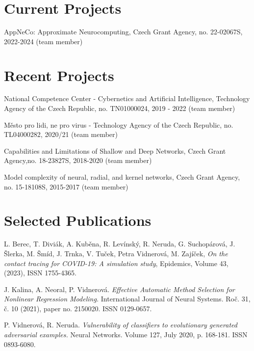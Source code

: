 \documentclass[a4paper, oneside, final]{scrartcl} %
\begin{document}
\section{Current  Projects}
 AppNeCo: Approximate Neurocomputing,
 Czech Grant Agency, no. 22-02067S, 2022-2024 (team member)

\section{Recent  Projects}
 \noindent
 National Competence Center - Cybernetics and Artificial Intelligence,
 Technology Agency of the Czech Republic, no. TN01000024, 2019 - 2022 (team member) 

 \noindent
 Město pro lidi, ne pro virus - Technology Agency of the Czech Republic, no. TL04000282, 2020/21 (team member) 

\noindent
Capabilities and Limitations of Shallow and Deep Networks,
Czech Grant Agency,\newline no. 18-23827S, 2018-2020 (team member)


\noindent
Model complexity of neural, radial, and kernel networks,
Czech Grant Agency, \newline no. 15-18108S, 	2015-2017 (team member) 



 \section{Selected Publications}
 \noindent
L. Berec, T. Diviák, A. Kuběna, R. Levínský, R. Neruda, G. Suchopárová, J. Šlerka, M. Šmíd, J. Trnka, V. Tuček, Petra Vidnerová, M. Zajíček,
{\em On the contact tracing for COVID-19: A simulation study}, 
Epidemics, Volume 43, (2023), ISSN 1755-4365.

 \noindent
J. Kalina, A. Neoral, P. Vidnerová.
{\em Effective Automatic Method Selection for Nonlinear Regression Modeling.}
International Journal of Neural Systems. Roč. 31, č. 10 (2021), paper no. 2150020. ISSN 0129-0657.

\noindent
P. Vidnerov\'a, R. Neruda.  {\em Vulnerability of classifiers to evolutionary
  generated adversarial examples.}  Neural Networks. Volume 127, July 2020,
p. 168-181. ISSN 0893-6080.
\end{document}
